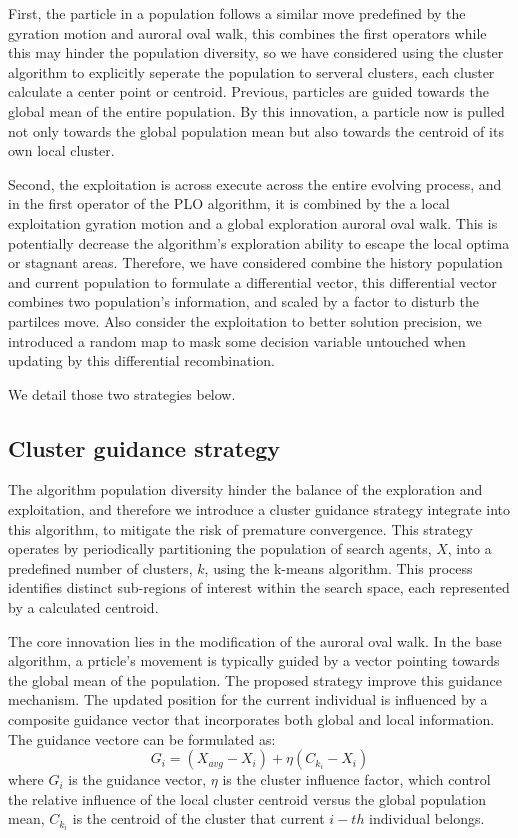 \documentclass[review]{elsarticle}
\begin{document}
First, the particle in a population follows a similar move predefined by the gyration motion and auroral oval walk, this combines the first operators while this may hinder the population diversity, so we have considered using the cluster algorithm to explicitly seperate the population to serveral clusters, each cluster calculate a center point or centroid. Previous, particles are guided towards the global mean of the entire population. By this innovation, a particle now is pulled not only towards the global population mean but also towards the centroid of its own local cluster.

Second, the exploitation is across execute across the entire evolving process, and in the first operator of the PLO algorithm, it is combined by the a local exploitation gyration motion and a global exploration auroral oval walk. This is potentially decrease the algorithm's exploration ability to escape the local optima or stagnant areas. Therefore, we have considered combine the history population and current population to formulate a differential vector, this differential vector combines two population's information, and scaled by a factor to disturb the partilces move. Also consider the exploitation to better solution precision, we introduced a random map to mask some decision variable untouched when updating by this differential recombination.

We detail those two strategies below.

\subsection{Cluster guidance strategy}
The algorithm population diversity hinder the balance of the exploration and exploitation, and therefore we introduce a cluster guidance strategy integrate into this algorithm, to mitigate the risk of premature convergence. This strategy operates by periodically partitioning the population of search agents, $X$, into a predefined number of clusters, $k$, using the k-means algorithm. This process identifies distinct sub-regions of interest within the search space, each represented by a calculated centroid.

The core innovation lies in the modification of the auroral oval walk. In the base algorithm, a prticle's movement is typically guided by a vector pointing towards the global mean of the population. The proposed strategy improve this guidance mechanism. The updated position for the current individual is influenced by a composite guidance vector that incorporates both global and local information. The guidance vectore can be formulated as:
\begin{equation}
G_i = (X_{avg} - X_i) + \eta(C_{k_{i}} - X_i)
\end{equation}
where $G_i$ is the guidance vector, $\eta$ is the cluster influence factor, which control the relative influence of the local cluster centroid versus the global population mean, $C_{k_{i}}$ is the centroid of the cluster that current $i-th$ individual belongs.
\end{document}
